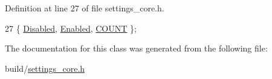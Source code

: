Definition at line 27 of file settings\+\_\+core.\+h.


\begin{DoxyCode}
27 \{ \hyperlink{classOkular_1_1SettingsCore_1_1EnumTextAntialias_a7609fd32c2acd57b5d3ce4ac3b01a9e4afd7c58c07865239fb469b1e0786810c2}{Disabled}, \hyperlink{classOkular_1_1SettingsCore_1_1EnumTextAntialias_a7609fd32c2acd57b5d3ce4ac3b01a9e4ab833e0a93d6d598e69c7fc84b5a134a1}{Enabled}, \hyperlink{classOkular_1_1SettingsCore_1_1EnumTextAntialias_a7609fd32c2acd57b5d3ce4ac3b01a9e4a9e0134eb06a8c9dedd81fe80727f898e}{COUNT} \};
\end{DoxyCode}


The documentation for this class was generated from the following file\+:\begin{DoxyCompactItemize}
\item 
build/\hyperlink{settings__core_8h}{settings\+\_\+core.\+h}\end{DoxyCompactItemize}
